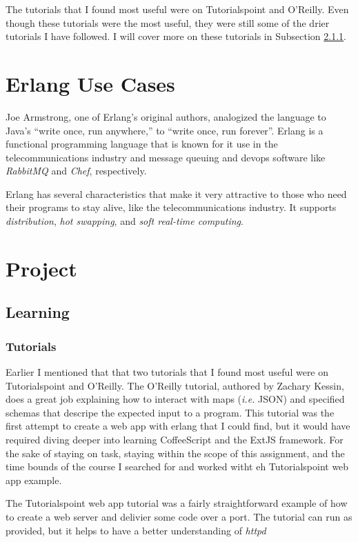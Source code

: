 \documentclass[11 pt]{IEEEtran}
\begin{document}
The tutorials that I found most useful were on Tutorialspoint\cite{tutorialspoint} and O'Reilly\cite{kessin}. Even though these tutorials were the most useful, they were still some of the drier tutorials I have followed. I will cover more on these tutorials in Subsection \ref{tutorials}.

\section{Erlang Use Cases}\label{usecase}
Joe Armstrong, one of Erlang's original authors, analogized the language to Java's ``write once, run anywhere,'' to ``write once, run forever''\cite{run-forever}. Erlang is a functional programming language that is known for it use in the telecommunications industry and message queuing and devops software like \emph{RabbitMQ}\cite{ribbitmq-wiki} and \emph{Chef}\cite{chef-wiki}, respectively. 

Erlang has several characteristics that make it very attractive to those who need their programs to stay alive, like the telecommunications industry. It supports \emph{distribution}, \emph{hot swapping}, and \emph{soft real-time computing}.

\section{Project}\label{project}
\subsection{Learning}
\subsubsection{Tutorials}\label{tutorials}
Earlier I mentioned that that two tutorials that I found most useful were on Tutorialspoint\cite{tutorialspoint} and O'Reilly\cite{kessin}. The O'Reilly tutorial, authored by Zachary Kessin, does a great job explaining how to interact with maps (\emph{i.e.} JSON) and specified schemas that descripe the expected input to a program. This tutorial was the first attempt to create a web app with erlang that I could find, but it would have required diving deeper into learning CoffeeScript and the ExtJS framework\cite{sencha}. For the sake of staying on task, staying within the scope of this assignment, and the time bounds of the course I searched for and worked witht eh Tutorialspoint web app example.

The Tutorialspoint web app tutorial was a fairly straightforward example of how to create a web server and delivier some code over a port. The tutorial can run as provided, but it helps to have a better understanding of \emph{httpd}
\end{document}
